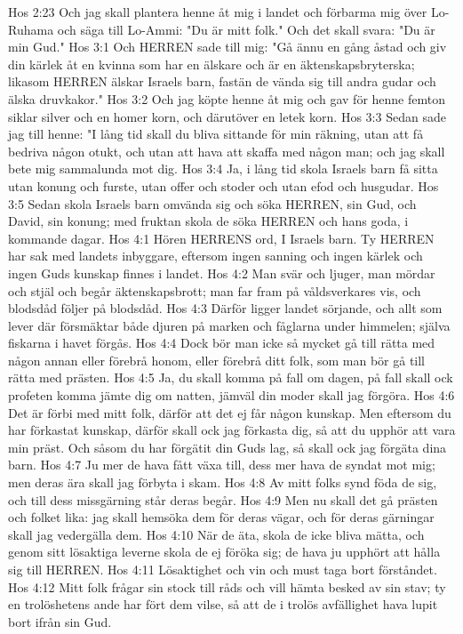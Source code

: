 Hos 2:23  Och jag skall plantera henne åt mig i landet och förbarma mig över Lo-Ruhama och säga till Lo-Ammi: "Du är mitt folk." Och det skall svara: "Du är min Gud."
Hos 3:1  Och HERREN sade till mig: "Gå ännu en gång åstad och giv din kärlek åt en kvinna som har en älskare och är en äktenskapsbryterska; likasom HERREN älskar Israels barn, fastän de vända sig till andra gudar och älska druvkakor."
Hos 3:2  Och jag köpte henne åt mig och gav för henne femton siklar silver och en homer korn, och därutöver en letek korn.
Hos 3:3  Sedan sade jag till henne: "I lång tid skall du bliva sittande för min räkning, utan att få bedriva någon otukt, och utan att hava att skaffa med någon man; och jag skall bete mig sammalunda mot dig.
Hos 3:4  Ja, i lång tid skola Israels barn få sitta utan konung och furste, utan offer och stoder och utan efod och husgudar.
Hos 3:5  Sedan skola Israels barn omvända sig och söka HERREN, sin Gud, och David, sin konung; med fruktan skola de söka HERREN och hans goda, i kommande dagar.
Hos 4:1  Hören HERRENS ord, I Israels barn. Ty HERREN har sak med landets inbyggare, eftersom ingen sanning och ingen kärlek och ingen Guds kunskap finnes i landet.
Hos 4:2  Man svär och ljuger, man mördar och stjäl och begår äktenskapsbrott; man far fram på våldsverkares vis, och blodsdåd följer på blodsdåd.
Hos 4:3  Därför ligger landet sörjande, och allt som lever där försmäktar både djuren på marken och fåglarna under himmelen; själva fiskarna i havet förgås.
Hos 4:4  Dock bör man icke så mycket gå till rätta med någon annan eller förebrå honom, eller förebrå ditt folk, som man bör gå till rätta med prästen.
Hos 4:5  Ja, du skall komma på fall om dagen, på fall skall ock profeten komma jämte dig om natten, jämväl din moder skall jag förgöra.
Hos 4:6  Det är förbi med mitt folk, därför att det ej får någon kunskap. Men eftersom du har förkastat kunskap, därför skall ock jag förkasta dig, så att du upphör att vara min präst. Och såsom du har förgätit din Guds lag, så skall ock jag förgäta dina barn.
Hos 4:7  Ju mer de hava fått växa till, dess mer hava de syndat mot mig; men deras ära skall jag förbyta i skam.
Hos 4:8  Av mitt folks synd föda de sig, och till dess missgärning står deras begår.
Hos 4:9  Men nu skall det gå prästen och folket lika: jag skall hemsöka dem för deras vägar, och för deras gärningar skall jag vedergälla dem.
Hos 4:10  När de äta, skola de icke bliva mätta, och genom sitt lösaktiga leverne skola de ej föröka sig; de hava ju upphört att hålla sig till HERREN.
Hos 4:11  Lösaktighet och vin och must taga bort förståndet.
Hos 4:12  Mitt folk frågar sin stock till råds och vill hämta besked av sin stav; ty en trolöshetens ande har fört dem vilse, så att de i trolös avfällighet hava lupit bort ifrån sin Gud.
